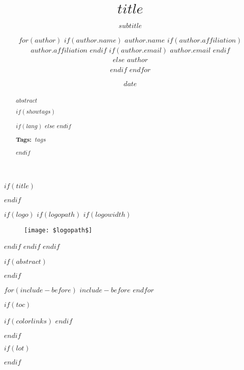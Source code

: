 \documentclass[$if(fontsize)$$fontsize$,$endif$$if(lang)$$babel-lang$,$endif$$if(papersize)$$papersize$paper,$endif$$for(classoption)$$classoption$$sep$,$endfor$]{$documentclass$}
\title{$title$}
\title{}
\subtitle{$subtitle$}
\author{$for(author)$
            $if(author.name)$
                $author.name$
                $if(author.affiliation)$
                \authorsep $author.affiliation$
                $endif$
                $if(author.email)$
                \authorsep $author.email$
                $endif$
                \\
            $else$
            $author$\\
            $endif$
           $endfor$}
\date{$date$}
\date{}
\begin{document}
$if(title)$
\maketitle
$endif$


$if(logo)$
$if(logopath)$
$if(logowidth)$
\begin{figure}[H]
\centering
\texttt{[image: \$logopath\$]}
\end{figure}

$endif$
$endif$
$endif$

$if(abstract)$
\begin{abstract}
$abstract$

$if(showtags)$

$if(lang)$
{\newcommand{\tagname}{Mots-clé:}} 
{\newcommand{\tagname}{Tags:}}
$else$
\newcommand{\tagname}{Tags:}
$endif$

\par
\textbf{\tagname\ }$tags$
\par
$endif$

\end{abstract}
$endif$



$for(include-before)$
$include-before$
$endfor$


$if(toc)$
{
$if(colorlinks)$
\hypersetup{linkcolor=$if(toccolor)$$toccolor$$else$black$endif$}
$endif$
\setcounter{tocdepth}{$toc-depth$}

        {
                {\renewcommand{\contentsname}{Sommaire}}} %
        { }
{}

\tableofcontents
}
$endif$


$if(lot)$
\listoftables
$endif$
\end{document}
